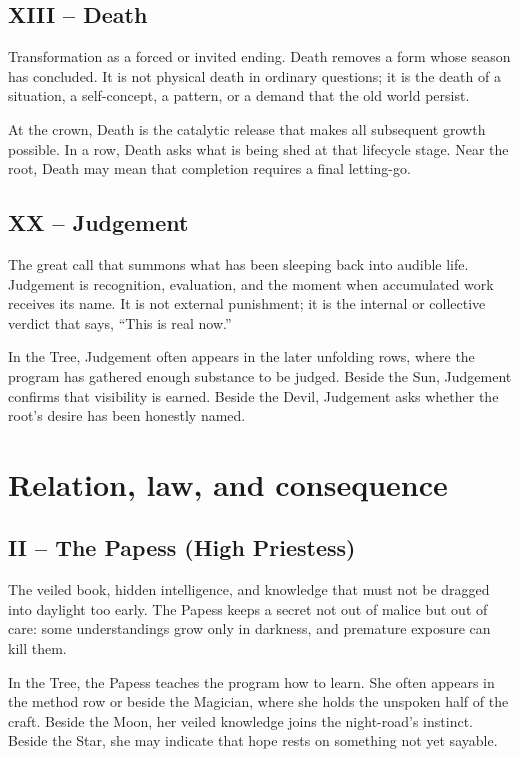 \subsection{XIII -- Death}

Transformation as a forced or invited ending. Death removes a form whose season
has concluded. It is not physical death in ordinary questions; it is the death of
a situation, a self-concept, a pattern, or a demand that the old world persist.

At the crown, Death is the catalytic release that makes all subsequent growth
possible. In a row, Death asks what is being shed at that lifecycle stage.
Near the root, Death may mean that completion requires a final letting-go.

\subsection{XX -- Judgement}

The great call that summons what has been sleeping back into audible life.
Judgement is recognition, evaluation, and the moment when accumulated work
receives its name. It is not external punishment; it is the internal or
collective verdict that says, ``This is real now.''

In the Tree, Judgement often appears in the later unfolding rows, where the
program has gathered enough substance to be judged. Beside the Sun, Judgement
confirms that visibility is earned. Beside the Devil, Judgement asks whether the
root's desire has been honestly named.

\section{Relation, law, and consequence}

\subsection{II -- The Papess (High Priestess)}

The veiled book, hidden intelligence, and knowledge that must not be dragged
into daylight too early. The Papess keeps a secret not out of malice but out
of care: some understandings grow only in darkness, and premature exposure
can kill them.

In the Tree, the Papess teaches the program how to learn. She often appears in
the method row or beside the Magician, where she holds the unspoken half of the
craft. Beside the Moon, her veiled knowledge joins the night-road's instinct.
Beside the Star, she may indicate that hope rests on something not yet sayable.

